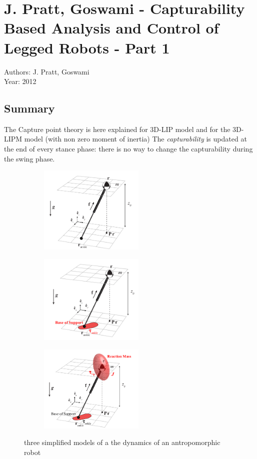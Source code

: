 \section{J. Pratt, Goswami - Capturability Based Analysis and Control of Legged Robots - Part 1 \cite{Koolen:2012:CAC:2344876.2344877}}
Authors: J. Pratt, Goswami\\
Year: 2012
\subsection*{Summary}
The Capture point theory is here explained for 3D-LIP model and for the 3D-LIPM model (with non zero moment of inertia)
The \textit{capturability} is updated at the end of every stance phase: there is no way to change the capturability during the swing phase.
\begin{figure}[h!]
\begin{subfigure}
  \centering
  \includegraphics[width=50mm]{CP.png}
  \label{PhasePlane}
\end{subfigure}
\begin{subfigure}
  \centering
  \includegraphics[width=50mm]{CPF.png}
  \label{PhasePlane}
\end{subfigure}
\begin{subfigure}
  \centering
  \includegraphics[width=50mm]{CPFM.png}
  \label{PhasePlane}
\end{subfigure}
\caption{three simplified models of a the dynamics of an antropomorphic robot}
\end{figure}

